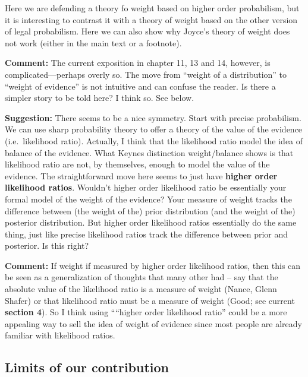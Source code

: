 \documentclass[
  10pt,
  dvipsnames,enabledeprecatedfontcommands]{scrartcl}
\begin{document}
Here we are defending a theory fo weight based on higher order
probabilism, but it is interesting to contrast it with a theory of
weight based on the other version of legal probabilism. Here we can also
show why Joyce's theory of weight does not work (either in the main text
or a footnote).

\textbf{Comment:} The current exposition in chapter 11, 13 and 14,
however, is complicated---perhaps overly so. The move from ``weight of a
distribution'' to ``weight of evidence'' is not intuitive and can
confuse the reader. Is there a simpler story to be told here? I think
so. See below.

\textbf{Suggestion:} There seems to be a nice symmetry. Start with
precise probabilism. We can use sharp probability theory to offer a
theory of the value of the evidence (i.e.~likelihood ratio). Actually, I
think that the likelihood ratio model the idea of balance of the
evidence. What Keynes distinction weight/balance shows is that
likelihood ratio are not, by themselves, enough to model the value of
the evidence. The straightforward move here seems to just have
\textbf{higher order likelihood ratios}. Wouldn't higher order
likelihood ratio be essentially your formal model of the weight of the
evidence? Your measure of weight tracks the difference between (the
weight of the) prior distribution (and the weight of the) posterior
distribution. But higher order likelihood ratios essentially do the same
thing, just like precise likelihood ratios track the difference between
prior and posterior. Is this right? 

\textbf{Comment:} If weight if measured by higher order likelihood
ratios, then this can be seen as a generalization of thoughts that many
other had -- say that the absolute value of the likelihood ratio is a
measure of weight (Nance, Glenn Shafer) or that likelihood ratio must be
a measure of weight (Good; see current \textbf{section 4}). So I think
using ````higher order likelihood ratio'' could be a more appealing way
to sell the idea of weight of evidence since most people are already
familiar with likelihood ratios.

\hypertarget{limits-of-our-contribution}{%
\subsection{Limits of our
contribution}\label{limits-of-our-contribution}}
\end{document}
